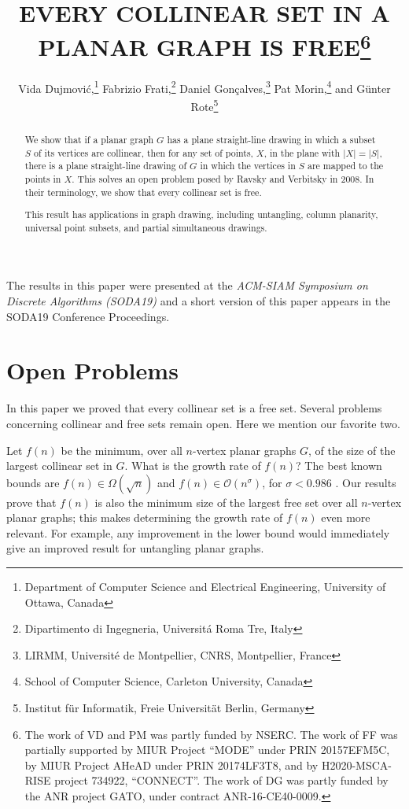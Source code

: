 \documentclass{patmorin}
\title{\MakeUppercase{Every Collinear Set in a Planar Graph Is Free}\thanks{%
    The work of VD and PM was partly funded by NSERC.
    The work of FF was 
partially supported by MIUR Project “MODE” under PRIN 20157EFM5C, by MIUR Project AHeAD under
PRIN 20174LF3T8, and by 
H2020-MSCA-RISE project 734922, “CONNECT”.
    The work of DG  was 
partly funded by the ANR project GATO, under contract
     ANR-16-CE40-0009.}}
\author{Vida Dujmovi\'c,\thanks{Department of Computer Science and Electrical Engineering, University of Ottawa, Canada}\quad
        Fabrizio Frati,\thanks{Dipartimento di Ingegneria, Universit\'a Roma Tre, Italy}\quad 
        Daniel Gon\c{c}alves,\thanks{LIRMM, Universit\'e de Montpellier, CNRS, Montpellier, France}\quad
        Pat Morin,\thanks{School of Computer Science, Carleton University, Canada}\quad 
        and G\"unter Rote\thanks{Institut f\"ur Informatik, Freie Universit\"at Berlin, Germany}}
\newif\ifSODA
\begin{document}
\begin{titlepage}
\maketitle

\begin{abstract}
  We show that if a planar graph $G$ has a plane straight-line drawing in
  which a subset $S$ of its vertices are collinear, then for any set of
  points, $X$, in the plane with $|X|=|S|$, there is a plane straight-line
  drawing of $G$ in which the vertices in $S$ are mapped to the points
  in $X$.  This solves an open problem posed by Ravsky and Verbitsky in
  2008.  In their terminology, we show that every collinear set is free.

  This result has applications in graph drawing, including untangling,
  column planarity, universal point subsets, and partial simultaneous
  drawings.
\end{abstract}
\ifSODA
\else
The results in this paper were presented at the \emph{ACM-SIAM
Symposium on Discrete Algorithms (SODA19)} and a short version of this paper
appears in the SODA19 Conference Proceedings.
\fi
\end{titlepage}


\tableofcontents

\newpage
{}







\section{Open Problems}

In this paper we proved that every collinear set is a free set. Several problems concerning collinear and free sets remain open. Here we mention our favorite two.

Let $f(n)$ be the minimum, over all $n$-vertex planar graphs $G$, of the size of the largest collinear set in $G$. What is the growth rate of $f(n)$? The best known bounds are $f(n)\in\Omega(\sqrt{n})$ and $f(n)\in \mathcal{O}(n^\sigma)$, for $\sigma < 0.986$ \cite{bose.dujmovic.ea:polynomial,ravsky.verbitsky:on}. Our results prove that $f(n)$ is also the minimum size of the largest free set over all $n$-vertex planar graphs; this makes determining the growth rate of $f(n)$ even more relevant. For example, any improvement in the lower bound would immediately give an improved result for untangling planar graphs.
%
\end{document}
